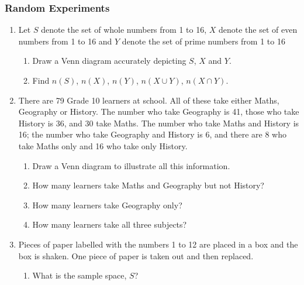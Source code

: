             \subsubsection{  Random Experiments }
            \nopagebreak
          \label{m39377*id111123}\begin{enumerate}[noitemsep, label=\textbf{\arabic*}. ] 
            \label{m39377*uid16}\item  Let $S$ denote the set of
whole numbers from 1 to 16,
$X$ denote the
set of even numbers from 1 to 16 and
$Y$ denote the
set of prime numbers from 1 to 16\label{m39377*id111223}\begin{enumerate}[noitemsep, label=\textbf{\alph*}. ] 
            \label{m39377*uid17}\item Draw a Venn
diagram accurately depicting $S$,
$X$ and $Y$.
\label{m39377*uid18}\item Find $n\left(S\right)$, $n\left(X\right)$, $n\left(Y\right)$, $n\left(X\cup Y\right)$, $n\left(X\cap Y\right)$.
\end{enumerate}
                \label{m39377*uid19}\item There are 79 Grade 10 learners at school. All of
these take either Maths, Geography or History. The number who take Geography is
41, those who take History is 36, and 30 take Maths. The number who take Maths
and History is 16; the number who take Geography and History is 6, and there are
8 who take Maths only and 16 who take only History.
\label{m39377*id111373}\begin{enumerate}[noitemsep, label=\textbf{\alph*}. ] 
            \label{m39377*uid20}\item Draw a Venn diagram to illustrate
all this information.
\label{m39377*uid21}\item How many learners take Maths and Geography but not
History?
\label{m39377*uid22}\item How many learners take Geography only?
\label{m39377*uid23}\item How many learners take all three subjects?
\end{enumerate}
                \label{m39377*uid24}\item Pieces of paper labelled with the numbers 1 to 12
are placed in a box and the box is shaken. One piece of paper is taken out and
then replaced.
\label{m39377*id111437}\begin{enumerate}[noitemsep, label=\textbf{\alph*}. ] 
            \label{m39377*uid25}\item What is the sample space, $S$?

\end{enumerate}
\end{enumerate}
